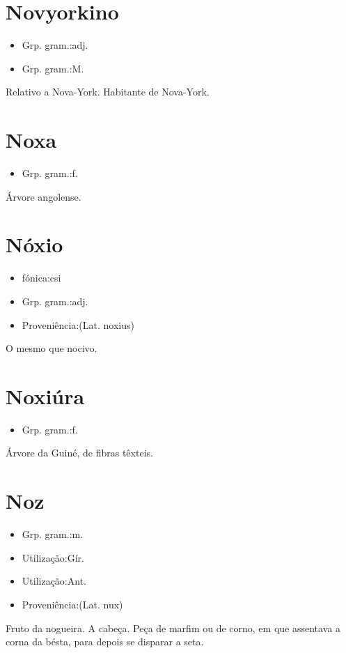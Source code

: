 \section{Novyorkino}
\begin{itemize}
\item {Grp. gram.:adj.}
\end{itemize}
\begin{itemize}
\item {Grp. gram.:M.}
\end{itemize}
Relativo a Nova-York.
Habitante de Nova-York.
\section{Noxa}
\begin{itemize}
\item {Grp. gram.:f.}
\end{itemize}
Árvore angolense.
\section{Nóxio}
\begin{itemize}
\item {fónica:csi}
\end{itemize}
\begin{itemize}
\item {Grp. gram.:adj.}
\end{itemize}
\begin{itemize}
\item {Proveniência:(Lat. \textunderscore noxius\textunderscore )}
\end{itemize}
O mesmo que \textunderscore nocivo\textunderscore .
\section{Noxiúra}
\begin{itemize}
\item {Grp. gram.:f.}
\end{itemize}
Árvore da Guiné, de fibras têxteis.
\section{Noz}
\begin{itemize}
\item {Grp. gram.:m.}
\end{itemize}
\begin{itemize}
\item {Utilização:Gír.}
\end{itemize}
\begin{itemize}
\item {Utilização:Ant.}
\end{itemize}
\begin{itemize}
\item {Proveniência:(Lat. \textunderscore nux\textunderscore )}
\end{itemize}
Fruto da nogueira.
A cabeça.
Peça de marfim ou de corno, em que assentava a corna da bésta, para depois se disparar a seta.
